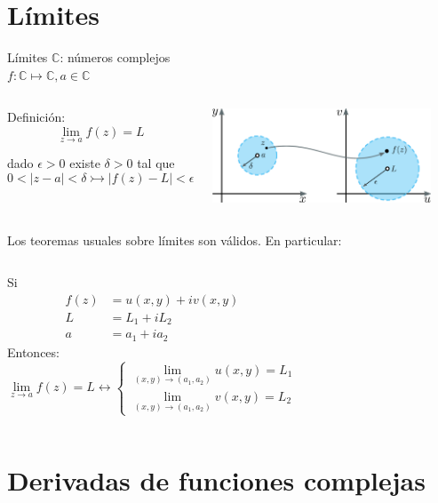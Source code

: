 \documentclass[9pt, aspectratio=169]{beamer}
\begin{document}
\section{Límites}

\begin{frame}{Límites}
	$\mathbb{C}$: números complejos \\
	$f: \mathbb{C} \mapsto \mathbb{C}, a \in \mathbb{C}$

	\begin{columns}[c]
		\begin{alertblock}{Definición:}
			\[ \lim_{z \rightarrow a} f(z) = L \]

			dado $\epsilon >0$ existe $\delta > 0$ tal que
			\[ 0 < |z - a| < \delta \rightarrowtail |f(z) - L| < \epsilon \]
		\end{alertblock} \pause
		\includegraphics[width=0.9\textwidth]{figs/fig-03}
	\end{columns} \pause

	\noindent Los teoremas usuales sobre límites \alert{son válidos}. En particular: \vspace{0.5em}

	\begin{columns}[t]
		Si
		\begin{align*}
			f(z) & = u(x, y) + i v(x, y) \\
			L    & = L_1 + i L_2         \\
			a    & = a_1 + i a_2
		\end{align*}
		Entonces:
		\[ \lim_{z \rightarrow a} f(z) = L \longleftrightarrow
			\begin{cases}
				\lim_{(x,y) \rightarrow (a_1, a_2)} u(x, y) = L_1 \\
				\lim_{(x,y) \rightarrow (a_1, a_2)} v(x, y) = L_2
			\end{cases}
		\]
	\end{columns}
\end{frame}

\section{Derivadas de funciones complejas}
\end{document}
